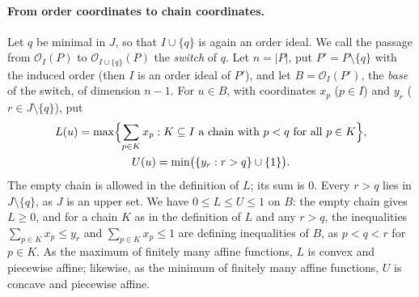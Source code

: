 \documentclass[11pt]{article}
\theoremstyle{definition}
\theoremstyle{remark}
\newcommand{\OO}{\mathcal O}
\begin{document}
\paragraph{From order coordinates to chain coordinates.}
Let $q$ be minimal in $J$, so that $I\cup\{q\}$ is again an order
ideal. We call the passage from $\OO_I(P)$ to $\OO_{I\cup\{q\}}(P)$ the
\emph{switch} of $q$. Let $n=|P|$, put $P'=P\setminus\{q\}$ with the induced order (then $I$ is an order ideal of $P'$),
and let $B=\OO_I(P')$, the \emph{base} of the switch, of dimension
$n-1$. For $u\in B$, with coordinates $x_p$ ($p\in I$) and $y_r$ ($r\in J\setminus\{q\}$), put
\begin{gather*}
L(u)=\max\Bigl\{\sum_{p\in K}x_p: K\subseteq I \text{ a chain with }
p<q \text{ for all } p\in K\Bigr\},\\
U(u)=\min\bigl(\{y_r:r>q\}\cup\{1\}\bigr).
\end{gather*}
The empty chain is allowed in the definition of $L$; its sum is $0$. Every $r>q$ lies in
$J\setminus\{q\}$, as $J$ is an upper set. We have $0\leq L\leq U\leq1$ on $B$: the empty chain gives $L\geq0$,
and for a chain $K$ as in the definition of $L$ and any $r>q$, the inequalities
$\sum_{p\in K}x_p\leq y_r$ and $\sum_{p\in K}x_p\leq1$ are defining inequalities of $B$, as $p<q<r$ for
$p\in K$. As the maximum of finitely many affine functions, $L$ is convex and piecewise affine; likewise, as the minimum of finitely many affine functions, $U$ is concave and piecewise affine.
\end{document}
